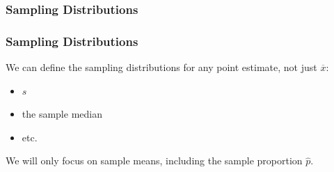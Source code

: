 \documentclass[handout]{beamer}
\newcommand{\blue}[1]{\textcolor{blue2}{#1}}
\newcommand{\xbar}{\overline{x}}
\begin{document}
\begin{frame}[fragile]
\frametitle{Sampling Distributions}

%
%
%
%
%
%

\end{frame}


\begin{frame}[fragile]
\frametitle{Sampling Distributions}

%
%
We can define the sampling distributions for \blue{any} point estimate, not just $\xbar$:
\pause \begin{itemize}
\item $s$
\item the sample median
\item etc.
\end{itemize}

\pause We will only focus on sample means, including the sample proportion $\widehat{p}$.

\end{frame}
\end{document}
